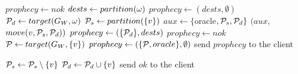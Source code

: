 \begin{algorithm}[t!]
\small

\begin{distribalgo}[1]


					\STATE $prophecy \leftarrow nok$
				\ELSE
					\STATE $dests \leftarrow partition(\omega)$
						\STATE $prophecy \leftarrow (dests,\emptyset)$
					\ELSE
						\STATE $\mathcal{P}_d \leftarrow target(G_W, \omega)$
							\STATE $\mathcal{P}_s \leftarrow partition(\{v\})$
								\STATE $aux \leftarrow \{$oracle$,\mathcal{P}_s,\mathcal{P}_d\}$    
								\STATE \amcast$(aux$, $move(v,\mathcal{P}_s,\mathcal{P}_d))$
							\ENDIF 
						\ENDFOR
						\STATE $prophecy \leftarrow (\{\mathcal{P}_d\},dests)$
					\ENDIF 
				\ENDIF
			\ENDINDENT
					\STATE $prophecy \leftarrow nok$
					\STATE $\mathcal{P} \leftarrow target(G_W, \{v\})$
					\STATE $prophecy \leftarrow (\{ \mathcal{P}, oracle \}, \emptyset)$
				\ENDIF
			\ENDINDENT
			\STATE send $prophecy$ to the client
	\ENDINDENT
	\vspace{1.0mm}

                \STATE $\mathcal{P}_s \leftarrow \mathcal{P}_s \setminus \{v\}$
                \STATE $\mathcal{P}_d \leftarrow \mathcal{P}_d \cup      \{v\}$
                \STATE send $ok$ to the client
	\ENDINDENT

        \vspace{1.0mm}
    

\end{distribalgo}
\end{algorithm}
